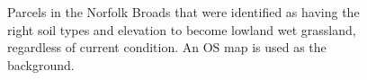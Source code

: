 \documentclass[
  12pt,
  letterpaper,
  DIV=11,
  numbers=noendperiod]{scrartcl}
\begin{document}
\begin{figure}[H]


\caption{\label{fig-BroadsSuitHab}Parcels in the Norfolk Broads that
were identified as having the right soil types and elevation to become
lowland wet grassland, regardless of current condition. An OS map is
used as the background.}

\end{figure}%
\end{document}
